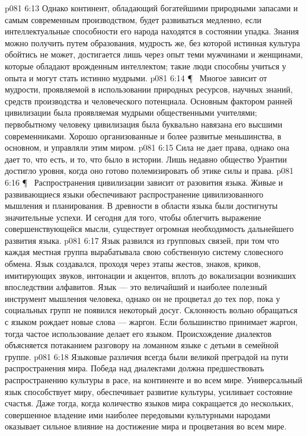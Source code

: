 \vs p081 6:13 Однако континент, обладающий богатейшими природными запасами и самым современным производством, будет развиваться медленно, если интеллектуальные способности его народа находятся в состоянии упадка. Знания можно получить путем образования, мудрость же, без которой истинная культура обойтись не может, достигается лишь через опыт теми мужчинами и женщинами, которые обладают врожденным интеллектом; такие люди способны учиться у опыта и могут стать истинно мудрыми.
\vs p081 6:14 \P\ \bibnobreakspace {} Многое зависит от мудрости, проявляемой в использовании природных ресурсов, научных знаний, средств производства и человеческого потенциала. Основным фактором ранней цивилизации была  проявляемая мудрыми общественными учителями; первобытному человеку цивилизация была буквально навязана его высшими современниками. Хорошо организованные и более развитые меньшинства, в основном, и управляли этим миром.
\vs p081 6:15 Сила не дает права, однако она дает то, что есть, и то, что было в истории. Лишь недавно общество Урантии достигло уровня, когда оно готово полемизировать об этике силы и права.
\vs p081 6:16 \P\ \bibnobreakspace {} Распространения цивилизации зависит от разовития языка. Живые и развивающиеся языки обеспечивают распространение цивилизованного мышления и планирования. В древности в области языка были достигнуты значительные успехи. И сегодня для того, чтобы облегчить выражение совершенствующейся мысли, существует огромная необходимость дальнейшего развития языка.
\vs p081 6:17 Язык развился из групповых связей, при том что каждая местная группа вырабатывала свою собственную систему словесного обмена. Язык создавался, проходя через этапы жестов, знаков, криков, имитирующих звуков, интонации и акцентов, вплоть до вокализации возникших впоследствии алфавитов. Язык --- это величайший и наиболее полезный инструмент мышления человека, однако он не процветал до тех пор, пока у социальных групп не появился некоторый досуг. Склонность вольно обращаться с языком рождает новые слова --- жаргон. Если большинство принимает жаргон, тогда частое использование делает его языком. Происхождение диалектов объясняется потаканием разговору на ломанном языке с детьми в семейной группе.
\vs p081 6:18 Языковые различия всегда были великой преградой на пути распространения мира. Победа над диалектами должна предшествовать распространению культуры в расе, на континенте и во всем мире. Универсальный язык способствует миру, обеспечивает развитие культуры, усиливает состояние счастья. Даже тогда, когда количество языков мира сокращается до нескольких, совершенное владение ими наиболее передовыми культурными народами оказывает сильное влияние на достижение мира и процветания во всем мире.
